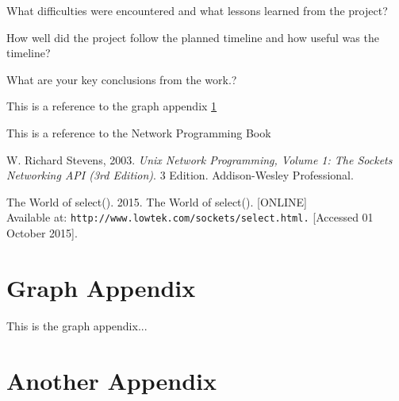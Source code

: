 \documentclass[12pt,a4paper,titlepage]{article}
\begin{document}
What difficulties were encountered and what lessons learned from the project? 

How well did the project follow the planned timeline and how useful was the timeline?  

What are your key conclusions from the work.?

This is a reference to the graph appendix \ref{appendix:graph}

This is a reference to the Network Programming Book \cite[p.~215]{stevensunp}

\newpage
%
\begin{thebibliography}{9}

W. Richard Stevens, 2003. \textit{Unix Network Programming, Volume 1: The Sockets Networking API (3rd Edition)}. 3 Edition. Addison-Wesley Professional.

The World of select(). 2015. The World of select(). [ONLINE] \\
Available at: \texttt{http://www.lowtek.com/sockets/select.html.} [Accessed 01 October 2015].

\end{thebibliography}

\newpage
\begin{appendices}

\section{Graph Appendix}
\label{appendix:graph}
This is the graph appendix...

\section{Another Appendix}

\end{appendices}
\end{document}

